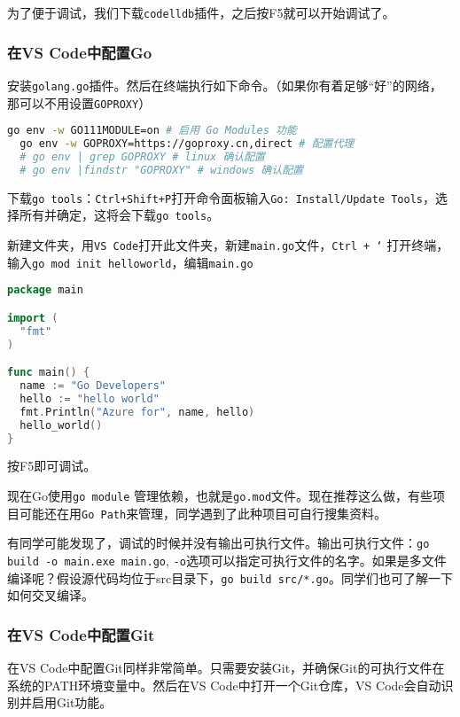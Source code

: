 为了便于调试，我们下载\texttt{codelldb}插件，之后按F5就可以开始调试了。

\subsubsection{在VS Code中配置Go}

安装\texttt{golang.go}插件。然后在终端执行如下命令。（如果你有着足够“好”的网络，那可以不用设置\texttt{GOPROXY}）

\begin{lstlisting}[language=bash]
  go env -w GO111MODULE=on # 启用 Go Modules 功能
  go env -w GOPROXY=https://goproxy.cn,direct # 配置代理
  # go env | grep GOPROXY # linux 确认配置
  # go env |findstr "GOPROXY" # windows 确认配置
\end{lstlisting}

下载\texttt{go tools}：\texttt{Ctrl+Shift+P}打开命令面板输入\texttt{Go: Install/Update Tools}，选择所有并确定，这将会下载\texttt{go tools}。

新建文件夹，用\texttt{VS Code}打开此文件夹，新建\texttt{main.go}文件，\texttt{Ctrl + `} 打开终端，输入\texttt{go mod init helloworld}，编辑\texttt{main.go}

\begin{lstlisting}[language=go]
package main

import (
  "fmt"
)

func main() {
  name := "Go Developers"
  hello := "hello world"
  fmt.Println("Azure for", name, hello)
  hello_world()
}
\end{lstlisting}

按F5即可调试。

\begin{note}
  现在Go使用\texttt{go module} 管理依赖，也就是\texttt{go.mod}文件。现在推荐这么做，有些项目可能还在用\texttt{Go Path}来管理，同学遇到了此种项目可自行搜集资料。
\end{note}

有同学可能发现了，调试的时候并没有输出可执行文件。输出可执行文件：\texttt{go build -o main.exe main.go}, \texttt{-o}选项可以指定可执行文件的名字。如果是多文件编译呢？假设源代码均位于src目录下，\texttt{go build src/*.go}。同学们也可了解一下如何交叉编译。

\subsubsection{在VS Code中配置Git}

在VS Code中配置Git同样非常简单。只需要安装Git，并确保Git的可执行文件在系统的PATH环境变量中。然后在VS Code中打开一个Git仓库，VS Code会自动识别并启用Git功能。

